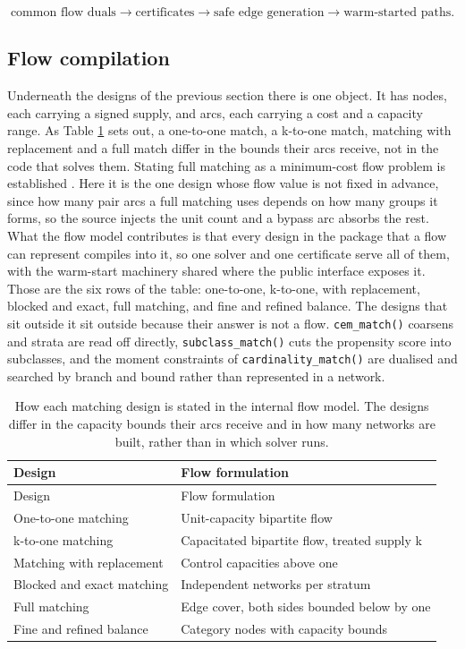 \[\text{common flow duals} \rightarrow \text{certificates}
\rightarrow \text{safe edge generation} \rightarrow \text{warm-started paths}.\]

\subsection{Flow compilation}\label{flow-compilation}

Underneath the designs of the previous section there is one object. It has
nodes, each carrying a signed supply, and arcs, each carrying a cost and a
capacity range. As Table \ref{tab:designs} sets out, a one-to-one match, a
k-to-one match, matching with replacement and a full match differ in the bounds
their arcs receive, not in the code that solves them. Stating full matching as a
minimum-cost flow problem is established \citep{HansenKlopfer2006}. Here it is the one design whose flow value is not fixed in advance, since how many pair arcs a
full matching uses depends on how many groups it forms, so the source injects
the unit count and a bypass arc absorbs the rest. What the flow model
contributes is that every
design in the package that a flow can represent compiles into it, so one
solver and one certificate serve all of them, with the warm-start machinery
shared where the public interface exposes it. Those are the
six rows of the table: one-to-one, k-to-one, with replacement, blocked and
exact, full matching, and fine and refined balance. The designs that sit
outside it sit outside because their answer is not a flow. \texttt{cem\_match()} coarsens and strata are read off directly, \texttt{subclass\_match()} cuts the
propensity score into subclasses, and the moment constraints of
\texttt{cardinality\_match()} are dualised and searched by branch and bound rather
than represented in a network.

\begin{longtable}[]{@{}ll@{}}
\caption{\label{tab:designs} How each matching design is stated in the internal flow
model. The designs differ in the capacity bounds their arcs receive and in how
many networks are built, rather than in which solver runs.}\tabularnewline
\toprule\noalign{}
Design & Flow formulation \\
\midrule\noalign{}
\endfirsthead
\toprule\noalign{}
Design & Flow formulation \\
\midrule\noalign{}
\endhead
\bottomrule\noalign{}
\endlastfoot
One-to-one matching & Unit-capacity bipartite flow \\
k-to-one matching & Capacitated bipartite flow, treated supply k \\
Matching with replacement & Control capacities above one \\
Blocked and exact matching & Independent networks per stratum \\
Full matching & Edge cover, both sides bounded below by one \\
Fine and refined balance & Category nodes with capacity bounds \\
\end{longtable}

